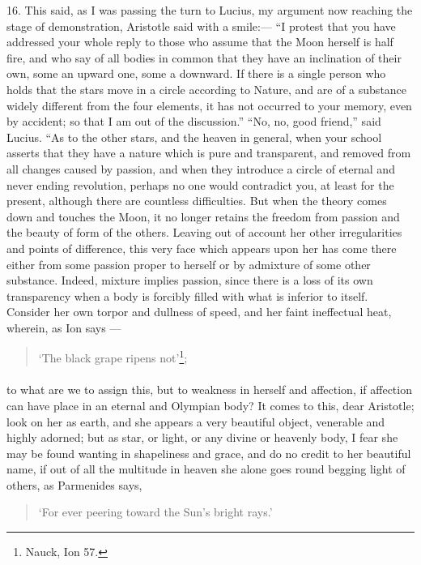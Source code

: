 \documentclass[a4paper, 11pt, oneside, polutonikogreek, english]{article}
\begin{document}
16. This said, as I was passing the turn to Lucius, my argument now reaching the stage of demonstration, Aristotle said with a smile:--- ``I protest that you have addressed your whole reply to those who assume that the Moon herself is half fire, and who say of all bodies in common that they have an inclination of their own, some an upward one, some a downward. If there is a single person who holds that the stars move in a circle according to Nature, and are of a substance widely different from the four elements, it has not occurred to your memory, even by accident; so that I am out of the discussion.'' ``No, no, good friend,'' said Lucius. ``As to the other stars, and the heaven in general, when your school asserts that they have a nature which is pure and transparent, and removed from all changes caused by passion, and when they introduce a circle of eternal and never ending revolution, perhaps no one would contradict you, at least for the present, although there are countless difficulties. But when the theory comes down and touches the Moon, it no longer retains the freedom from passion and the beauty of form of the others. Leaving out of account her other irregularities and points of difference, this very face which appears upon her has come there either from some passion proper to herself or by admixture of some other substance. Indeed, mixture implies passion, since there is a loss of its own transparency when a body is forcibly filled with what is inferior to itself. Consider her own torpor and dullness of speed, and her faint ineffectual heat, wherein, as Ion says ---
\begin{quotation}
`The black grape ripens not'\footnote{Nauck, Ion 57.};
\end{quotation}
\paragraph{}
to what are we to assign this, but to weakness in herself and affection, if affection can have place in an eternal and Olympian body? It comes to this, dear Aristotle; look on her as earth, and she appears a very beautiful object, venerable and highly adorned; but as star, or light, or any divine or heavenly body, I fear she may be found wanting in shapeliness and grace, and do no credit to her beautiful name, if out of all the multitude in heaven she alone goes round begging light of others, as Parmenides says,
\begin{quotation}
`For ever peering toward the Sun's bright rays.'
\end{quotation}
\end{document}
